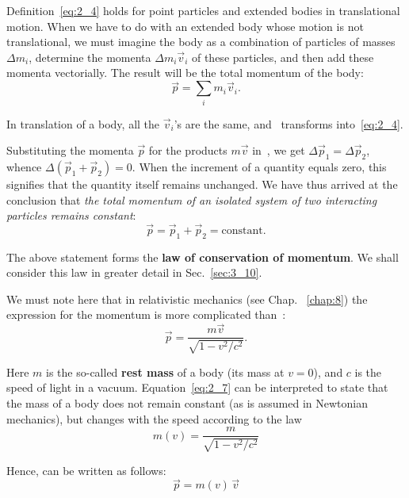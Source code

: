 \noindent
Definition~\eqref{eq:2_4} holds for point particles and extended bodies in translational motion. When we have to do with an extended body whose motion is not translational, we must imagine the body as a combination of particles of masses $\Delta m_i$, determine the momenta $\Delta m_i\vec{v}_i$ of these particles, and then add these momenta vectorially. The result will be the total momentum of the body:
\begin{equation}\label{eq:2_5}
\vec{p} = \sum_{i} m_i \vec{v}_i.
\end{equation}

\noindent
In translation of a body, all the $\vec{v}_i$'s are the same, and~ transforms into~\eqref{eq:2_4}. 

Substituting the momenta $\vec{p}$ for the products $m\vec{v}$ in~, we get $\Delta\vec{p}_1=\Delta\vec{p}_2$, whence $\Delta(\vec{p}_1+\vec{p}_2)=0$. When the increment of a quantity equals zero, this signifies that the quantity itself remains unchanged. We have thus arrived at the conclusion that \textit{the total momentum of an isolated system of two interacting particles remains constant}:
\begin{equation}\label{eq:2_6}
\vec{p} = \vec{p}_1 + \vec{p}_2 = \text{constant}.
\end{equation}

\noindent
The above statement forms the \textbf{law of conservation of momentum}. We shall consider this law in greater detail in Sec.~\ref{sec:3_10}.

We must note here that in relativistic mechanics (see Chap. ~\ref{chap:8}) the expression for the momentum is more complicated than~:
\begin{equation}\label{eq:2_7}
\vec{p} = \frac{m \vec{v}}{\sqrt{1 - v^2/c^2}}.
\end{equation}

\noindent
Here $m$ is the so-called \textbf{rest mass} of a body (its mass at $v=0$), and $c$ is the speed of light in a vacuum. Equation~\eqref{eq:2_7} can be interpreted to state that the mass of a body does not remain constant (as is assumed in Newtonian mechanics), but changes with the speed according to the law
\begin{equation}\label{eq:2_8}
m(v) = \frac{m}{\sqrt{1 - v^2/c^2}}
\end{equation}

\noindent
Hence,  can be written as follows:
\begin{equation}\label{eq:2_9}
\vec{p} = m(v)\,\vec{v}
\end{equation}

